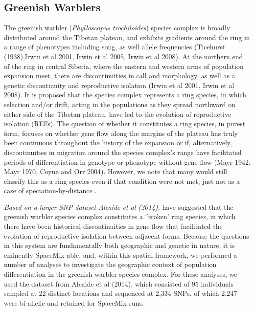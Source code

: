 \documentclass[12pt]{article}
\newcommand{\gc}[1]{{\em \color{blue} #1}}
\begin{document}
\subsection*{Greenish Warblers}  
The greenish warbler (\emph{Phylloscopus trochiloides}) species complex is broadly distributed around the Tibetan plateau, and exhibits gradients around the ring in a range of phenotypes including song, as well allele frequencies (Ticehurst (1938),Irwin et al 2001, Irwin et al 2005, Irwin et al 2008).  At the northern end of the ring in central Siberia, where the eastern and western arms of population expansion meet, there are discontinuities in call and morphology, as well as a genetic discontinuity and reproductive isolation (Irwin et al 2001, Irwin et al 2008). It is proposed that the species complex represents a ring species, in which selection and/or drift, acting in the populations as they spread northward on either side of the Tibetan plateau, have led to the evolution of reproductive isolation (REFs).  The question of whether it constitutes a ring species, in purest form, focuses on whether gene flow along the margins of the plateau has truly been continuous throughout the history of the expansion or if, alternatively, discontinuities in migration around the species complex's range have facilitated periods of differentiation in genotype or phenotype without gene flow (Mayr 1942, Mayr 1970, Coyne and Orr 2004).  However, we note that many would still classify this as a ring species even if that condition were not met, just not as a case of speciation-by-distance \citep[see][ for discussion]{}.


\gc{Based on a larger SNP dataset Alcaide et al (2014),} have suggested that the greenish warbler species complex constitutes a `broken' ring species, in which there have been historical discontinuities in gene flow that facilitated the evolution of reproductive isolation between adjacent forms.  Because the questions in this system are fundamentally both geographic and genetic in nature, it is eminently SpaceMix-able, and, within this spatial framework, we performed a number of analyses to investigate the geographic context of population differentiation in the greenish warbler species complex. For these analyses, we used the dataset from Alcaide et al (2014), which consisted of 95 individuals sampled at 22 distinct locations and sequenced at 2,334 SNPs, of which 2,247 were bi-allelic and retained for SpaceMix runs. 
\end{document}
